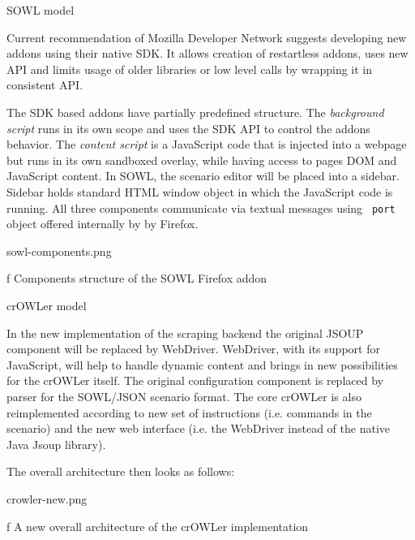 \secc SOWL model

Current recommendation of Mozilla Developer Network suggests developing new
addons using their native SDK. It allows creation of restartless addons, uses 
new API and limits usage of older libraries or low level calls by wrapping it 
in consistent API. 

The SDK based addons have partially predefined structure. The {\em background script}
runs in its own scope and uses the SDK API to control the addons behavior.
The {\em content script} is a JavaScript code that is injected into a webpage
but runs in its own sandboxed overlay, while having access to pages DOM and
JavaScript content. In SOWL, the scenario editor will be placed into a sidebar.
Sidebar holds standard HTML window object in which the JavaScript code is
running.  All three components communicate via textual messages using {\tt
port} object offered internally by by Firefox. 

\midinsert
{}
\picw=12cm \cinspic sowl-components.png
\caption/f Components structure of the SOWL Firefox addon
\endinsert


\secc crOWLer model

In the new implementation of the scraping backend the original JSOUP component
will be replaced by WebDriver. WebDriver, with its support for JavaScript,
will help to handle dynamic content and brings in new possibilities for the
crOWLer itself. The original configuration component is replaced by parser for
the SOWL/JSON scenario format. The core crOWLer is also reimplemented
according to new set of instructions (i.e. commands in the scenario) and the
new web interface (i.e. the WebDriver instead of the native Java Jsoup
library). 

The overall architecture then looks as follows: 

\midinsert
{}
\picw=7.5cm \cinspic crowler-new.png
\caption/f A new overall architecture of the crOWLer implementation 
\endinsert

